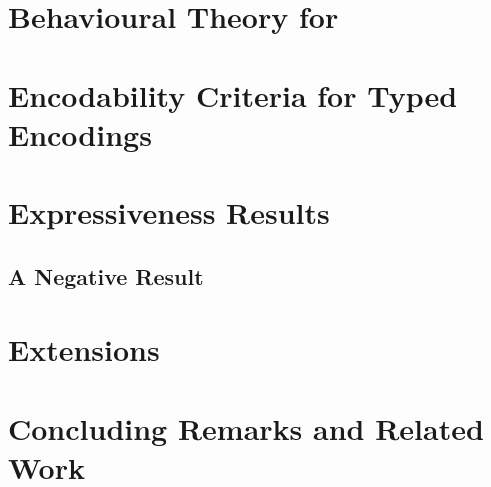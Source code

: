 \documentclass[runningheads]{llncs}
\begin{document}



\section{Behavioural Theory for \HOp}\label{sec:bt}


%



\section{Encodability Criteria for Typed Encodings}
\label{s:expr}


\section{Expressiveness Results}
\label{sec:positive}


\subsection{A Negative Result}
\label{ss:negative}


\section{Extensions}
\label{sec:extension}





%

\section{Concluding Remarks and Related Work}
\label{sec:relwork}


%
\end{document}
